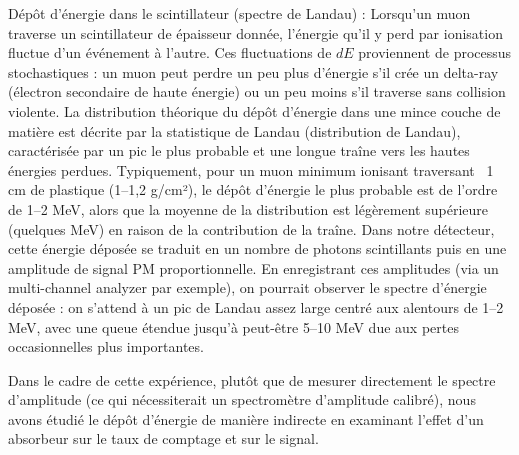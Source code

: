 \documentclass[a4paper,12pt,twoside]{article}
\begin{document}
Dépôt d’énergie dans le scintillateur (spectre de Landau) : Lorsqu’un muon traverse un scintillateur de épaisseur donnée, l’énergie qu’il y perd par ionisation fluctue d’un événement à l’autre. Ces fluctuations de $dE$ proviennent de processus stochastiques : un muon peut perdre un peu plus d’énergie s’il crée un delta-ray (électron secondaire de haute énergie) ou un peu moins s’il traverse sans collision violente. La distribution théorique du dépôt d’énergie dans une mince couche de matière est décrite par la statistique de Landau (distribution de Landau), caractérisée par un pic le plus probable et une longue traîne vers les hautes énergies perdues. Typiquement, pour un muon minimum ionisant traversant ~1 cm de plastique (1–1,2 g/cm²), le dépôt d’énergie le plus probable est de l’ordre de 1–2 MeV, alors que la moyenne de la distribution est légèrement supérieure (quelques MeV) en raison de la contribution de la traîne. Dans notre détecteur, cette énergie déposée se traduit en un nombre de photons scintillants puis en une amplitude de signal PM proportionnelle. En enregistrant ces amplitudes (via un multi-channel analyzer par exemple), on pourrait observer le spectre d’énergie déposée : on s’attend à un pic de Landau assez large centré aux alentours de 1–2 MeV, avec une queue étendue jusqu’à peut-être 5–10 MeV due aux pertes occasionnelles plus importantes.

Dans le cadre de cette expérience, plutôt que de mesurer directement le spectre d’amplitude (ce qui nécessiterait un spectromètre d’amplitude calibré), nous avons étudié le dépôt d’énergie de manière indirecte en examinant l’effet d’un absorbeur sur le taux de comptage et sur le signal.
\end{document}
